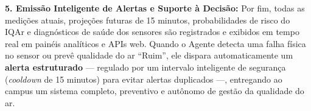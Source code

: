 \documentclass[11pt, a4paper]{article}
\begin{document}
\noindent\textbf{5. Emissão Inteligente de Alertas e Suporte à Decisão:}
Por fim, todas as medições atuais, projeções futuras de 15 minutos, probabilidades de risco do IQAr e diagnósticos de saúde dos sensores são registrados e exibidos em tempo real em painéis analíticos e APIs web. Quando o Agente detecta uma falha física no sensor ou prevê qualidade do ar ``Ruim'', ele dispara automaticamente um \textbf{alerta estruturado} --- regulado por um intervalo inteligente de segurança (\emph{cooldown} de 15 minutos) para evitar alertas duplicados ---, entregando ao campus um sistema completo, preventivo e autônomo de gestão da qualidade do ar.
\end{document}
